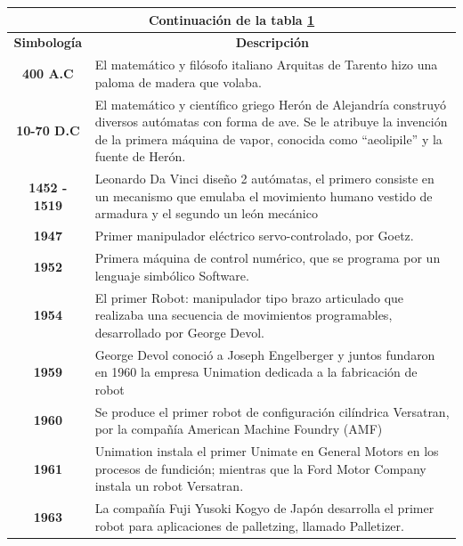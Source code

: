  \begin{longtable}[c]{c m{12cm}}
     \label{tab:cap2_efemerides}\\

     \endfirsthead
    
     \hline
     \multicolumn{2}{|c|}{Continuación de la tabla \ref{tab:cap2_efemerides}}\\
     \hline
     \endhead
    
     \hline
     \endfoot
    
     \hline
     \textbf{Simbología}  & \multicolumn{1}{c}{\textbf{Descripción}}  \\\hline\hline
     \textbf{400 A.C} & El matemático y filósofo italiano Arquitas de Tarento hizo una paloma de madera que volaba. \\ \hline
     \textbf{10-70 D.C} & El matemático y científico griego Herón de Alejandría construyó diversos autómatas con forma de ave. Se le atribuye la invención de la primera máquina de vapor, conocida como “aeolipile” y la fuente de Herón. \\ \hline
     \textbf{1452 - 1519} & Leonardo Da Vinci diseño 2 autómatas, el primero consiste en un mecanismo que emulaba el movimiento humano vestido de armadura y el segundo un león mecánico \\ \hline
     \textbf{1947} & Primer manipulador eléctrico servo-controlado, por Goetz. \\ \hline
     \textbf{1952} & Primera máquina de control numérico, que se programa por un lenguaje simbólico Software. \\ \hline
     \textbf{1954} & El primer Robot: manipulador tipo brazo articulado que realizaba una secuencia de movimientos programables, desarrollado por George Devol. \\ \hline
     \textbf{1959} & George Devol conoció a Joseph Engelberger y juntos fundaron en 1960 la empresa Unimation dedicada a la fabricación de robot \\ \hline
     \textbf{1960} & Se produce el primer robot de configuración cilíndrica Versatran, por la compañía American Machine Foundry (AMF) \\ \hline
     \textbf{1961} & Unimation instala el primer Unimate en General Motors en los procesos de fundición; mientras que la Ford Motor Company instala un robot Versatran. \\ \hline
     \textbf{1963} & La compañía Fuji Yusoki Kogyo de Japón desarrolla el primer robot para aplicaciones de palletzing, llamado Palletizer. \\ \hline

\end{longtable}
